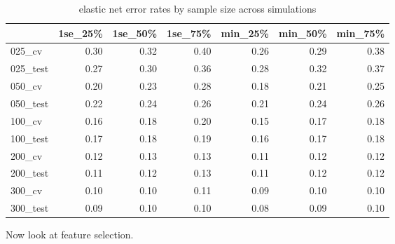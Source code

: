 \documentclass[
]{book}
\begin{document}
\begin{table}

\caption{\label{tab:hcc5hmC-glmnetSuiteB-print-enet-simRes-errors-overSim}elastic net error rates by sample size across simulations}
\centering
\begin{tabular}[t]{l|r|r|r|r|r|r}
\hline
  & 1se\_25\% & 1se\_50\% & 1se\_75\% & min\_25\% & min\_50\% & min\_75\%\\
\hline
025\_cv & 0.30 & 0.32 & 0.40 & 0.26 & 0.29 & 0.38\\
\hline
025\_test & 0.27 & 0.30 & 0.36 & 0.28 & 0.32 & 0.37\\
\hline
050\_cv & 0.20 & 0.23 & 0.28 & 0.18 & 0.21 & 0.25\\
\hline
050\_test & 0.22 & 0.24 & 0.26 & 0.21 & 0.24 & 0.26\\
\hline
100\_cv & 0.16 & 0.18 & 0.20 & 0.15 & 0.17 & 0.18\\
\hline
100\_test & 0.17 & 0.18 & 0.19 & 0.16 & 0.17 & 0.18\\
\hline
200\_cv & 0.12 & 0.13 & 0.13 & 0.11 & 0.12 & 0.12\\
\hline
200\_test & 0.11 & 0.12 & 0.13 & 0.11 & 0.12 & 0.12\\
\hline
300\_cv & 0.10 & 0.10 & 0.11 & 0.09 & 0.10 & 0.10\\
\hline
300\_test & 0.09 & 0.10 & 0.10 & 0.08 & 0.09 & 0.10\\
\hline
\end{tabular}
\end{table}

Now look at feature selection.
\end{document}
